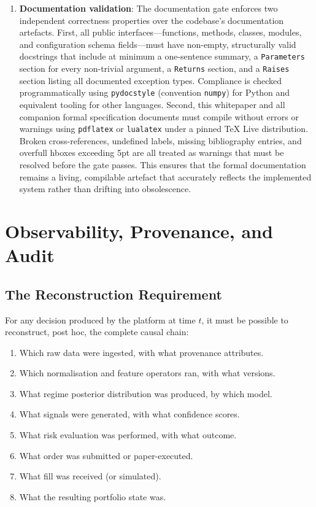 \documentclass[12pt,openany]{book}
\numberwithin{equation}{chapter}
\theoremstyle{plain}
\theoremstyle{definition}
\theoremstyle{remark}
\begin{document}
\begin{enumerate}
    \item \textbf{Documentation validation}: The documentation gate enforces two
          independent correctness properties over the codebase's documentation
          artefacts. First, all public interfaces—functions, methods, classes,
          modules, and configuration schema fields—must have non-empty, structurally
          valid docstrings that include at minimum a one-sentence summary, a
          \texttt{Parameters} section for every non-trivial argument, a
          \texttt{Returns} section, and a \texttt{Raises} section listing all
          documented exception types. Compliance is checked programmatically using
          \texttt{pydocstyle} (convention \texttt{numpy}) for Python and equivalent
          tooling for other languages. Second, this whitepaper and all companion
          formal specification documents must compile without errors or warnings
          using \texttt{pdflatex} or \texttt{lualatex} under a pinned \TeX{} Live
          distribution. Broken cross-references, undefined labels, missing bibliography
          entries, and overfull hboxes exceeding 5pt are all treated as warnings that
          must be resolved before the gate passes. This ensures that the formal
          documentation remains a living, compilable artefact that accurately reflects
          the implemented system rather than drifting into obsolescence.
\end{enumerate}



\chapter{Observability, Provenance, and Audit}

\section{The Reconstruction Requirement}

For any decision produced by the platform at time $t$, it must be possible
to reconstruct, post hoc, the complete causal chain:

\begin{enumerate}
    \item Which raw data were ingested, with what provenance attributes.
    \item Which normalisation and feature operators ran, with what versions.
    \item What regime posterior distribution was produced, by which model.
    \item What signals were generated, with what confidence scores.
    \item What risk evaluation was performed, with what outcome.
    \item What order was submitted or paper-executed.
    \item What fill was received (or simulated).
    \item What the resulting portfolio state was.
\end{enumerate}
\end{document}
